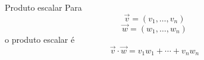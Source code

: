 \documentclass[fleqn,aspectratio=169,12pt]{beamer}
\begin{document}
\begin{frame}{Produto escalar}
  Para
  \[
    \vec{v} = (v_1, \ldots, v_n)
  \]
  \[
    \vec{w} = (w_1, \ldots, w_n)
  \]
  o produto escalar é
  \[
    \vec{v}\cdot\vec{w} = v_1w_1 + \cdots + v_nw_n
  \]
\end{frame}

%
%

\end{document}

